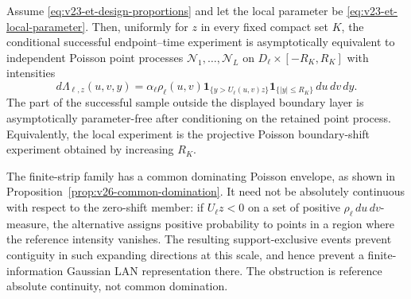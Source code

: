 \begin{theorem}
\label{thm:v23-et-poisson}
Assume \eqref{eq:v23-et-design-proportions} and let the local parameter be
\eqref{eq:v23-et-local-parameter}.  Then, uniformly for \(z\) in every fixed
compact set \(K\), the conditional successful endpoint--time experiment is
asymptotically equivalent to independent Poisson point processes
\(\mathcal N_1,\ldots,\mathcal N_L\) on
\(D_\ell\times[-R_K,R_K]\) with intensities
\begin{equation}\label{eq:v23-et-poisson-intensity}
 d\Lambda_{\ell,z}(u,v,y)
 =\alpha_\ell\rho_\ell(u,v)
   \mathbf 1_{\{y>U_\ell(u,v)z\}}
   \mathbf 1_{\{|y|\le R_K\}}\,du\,dv\,dy.
\end{equation}
The part of the successful sample outside the displayed boundary layer is
asymptotically parameter-free after conditioning on the retained point
process.  Equivalently, the local experiment is the projective Poisson
boundary-shift experiment obtained by increasing \(R_K\).

The finite-strip family has a common dominating Poisson envelope, as
shown in Proposition~\ref{prop:v26-common-domination}.  It need not be
absolutely continuous with respect to the zero-shift member: if
\(U_\ell z<0\) on a set of positive \(\rho_\ell\,du\,dv\)-measure, the
alternative assigns positive probability to points in a region where the
reference intensity vanishes.  The resulting support-exclusive events
prevent contiguity in such expanding directions at this scale, and hence
prevent a finite-information Gaussian LAN representation there.  The
obstruction is reference absolute continuity, not common domination.
\end{theorem}

